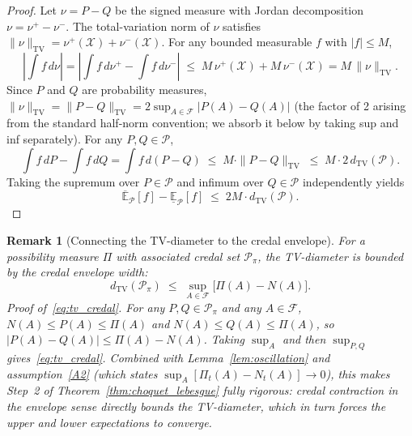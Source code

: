 \documentclass[12pt]{article}
\newtheorem{remark}[theorem]{Remark}
\newcommand{\Ppi}{\mathcal{P}_\pi}
\newcommand{\calF}{\mathcal{F}}
\newcommand{\calX}{\mathcal{X}}
\newcommand{\E}{\mathbb{E}}
\begin{document}
\begin{proof}
Let $\nu = P - Q$ be the signed measure with Jordan decomposition
$\nu = \nu^+ - \nu^-$.
The total-variation norm of $\nu$ satisfies
$\|\nu\|_{\mathrm{TV}} = \nu^+(\calX) + \nu^-(\calX)$.
For any bounded measurable $f$ with $|f|\le M$,
\begin{equation}
\left|\int f\,d\nu\right|
= \left|\int f\,d\nu^+ - \int f\,d\nu^-\right|
\;\le\; M\,\nu^+(\calX) + M\,\nu^-(\calX)
= M\,\|\nu\|_{\mathrm{TV}}.
\label{eq:tv_bound}
\end{equation}
Since $P$ and $Q$ are probability measures,
$\|\nu\|_{\mathrm{TV}} = \|P-Q\|_{\mathrm{TV}}
= 2\sup_{A\in\calF}|P(A)-Q(A)|$
(the factor of 2 arising from the standard half-norm convention;
we absorb it below by taking sup and inf separately).
For any $P,Q\in\mathcal{P}$,
\begin{equation}
\int f\,dP - \int f\,dQ
= \int f\,d(P-Q)
\;\le\; M\cdot\|P-Q\|_{\mathrm{TV}}
\;\le\; M\cdot 2\,d_{\mathrm{TV}}(\mathcal{P}).
\label{eq:pq_diff}
\end{equation}
Taking the supremum over $P\in\mathcal{P}$ and infimum over
$Q\in\mathcal{P}$ independently yields
\begin{equation}
\overline{\E}_\mathcal{P}[f] - \underline{\E}_\mathcal{P}[f]
\;\le\; 2M\cdot d_{\mathrm{TV}}(\mathcal{P}).
\end{equation}
\end{proof}

\begin{remark}[Connecting the TV-diameter to the credal envelope]
\label{rem:tv_diameter}
For a possibility measure $\Pi$ with associated credal set $\Ppi$,
the TV-diameter is bounded by the credal envelope width:
\begin{equation}
d_{\mathrm{TV}}(\Ppi)
\;\le\; \sup_{A\in\calF}\bigl[\Pi(A)-N(A)\bigr].
\label{eq:tv_credal}
\end{equation}
\emph{Proof of~\eqref{eq:tv_credal}.}
For any $P,Q\in\Ppi$ and any $A\in\calF$,
$N(A)\le P(A)\le\Pi(A)$ and $N(A)\le Q(A)\le\Pi(A)$,
so $|P(A)-Q(A)|\le\Pi(A)-N(A)$.
Taking $\sup_{A}$ and then $\sup_{P,Q}$ gives~\eqref{eq:tv_credal}.
Combined with Lemma~\ref{lem:oscillation} and assumption~\eqref{A2}
(which states $\sup_A[\Pi_t(A)-N_t(A)]\to 0$), this makes Step~2 of
Theorem~\ref{thm:choquet_lebesgue} fully rigorous:
credal contraction in the envelope sense directly bounds the
TV-diameter, which in turn forces the upper and lower expectations
to converge.
\end{remark}
\end{document}
